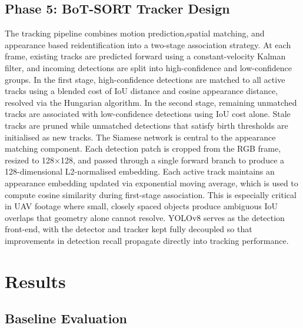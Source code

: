 \documentclass[conference]{IEEEtran}
\begin{document}
\subsection{Phase 5: BoT-SORT Tracker Design}
The tracking pipeline combines motion prediction,spatial matching, and appearance based reidentification into a two-stage association strategy. At each frame, existing tracks are predicted forward using a constant-velocity Kalman filter, and incoming detections are split into high-confidence and low-confidence groups. In the first stage, high-confidence detections are matched to all active tracks using a blended cost of IoU distance and cosine appearance distance, resolved via the Hungarian algorithm. In the second stage, remaining unmatched tracks are associated with low-confidence detections using IoU cost alone. Stale tracks are pruned while unmatched detections that satisfy birth thresholds are initialised as new tracks.
The Siamese network is central to the appearance matching component. Each detection patch is cropped from the RGB frame, resized to 128×128, and passed through a single forward branch to produce a 128-dimensional L2-normalised embedding. Each active track maintains an appearance embedding updated via exponential moving average, which is used to compute cosine similarity during first-stage association. This is especially critical in UAV footage where small, closely spaced objects produce ambiguous IoU overlaps that geometry alone cannot resolve. YOLOv8 serves as the detection front-end, with the detector and tracker kept fully decoupled so that improvements in detection recall propagate directly into tracking performance.


\section{Results}
\label{sec:results}

\subsection{Baseline Evaluation}
\end{document}
